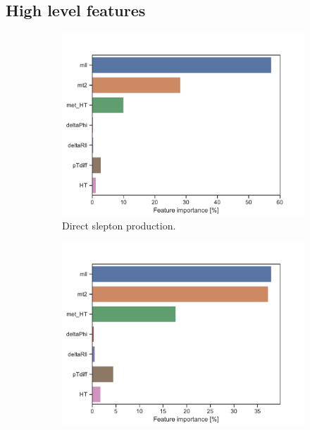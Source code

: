 \subsection{High level features}

\begin{figure}[H]
    \centering
    \begin{subfigure}[t!]{0.49\textwidth}
        \includegraphics[width = \textwidth]{Figures/SlepSlep/ML/BDT/High_level/Inter/featureImportance.pdf}
        \caption{Direct slepton production.}
        \label{fig:}
    \end{subfigure}
    \begin{subfigure}[t!]{0.49\textwidth}
        \includegraphics[width = \textwidth]{Figures/SlepSnu/BDT/High_level/Inter/featureImportance.pdf}

\end{subfigure}
\end{figure}
